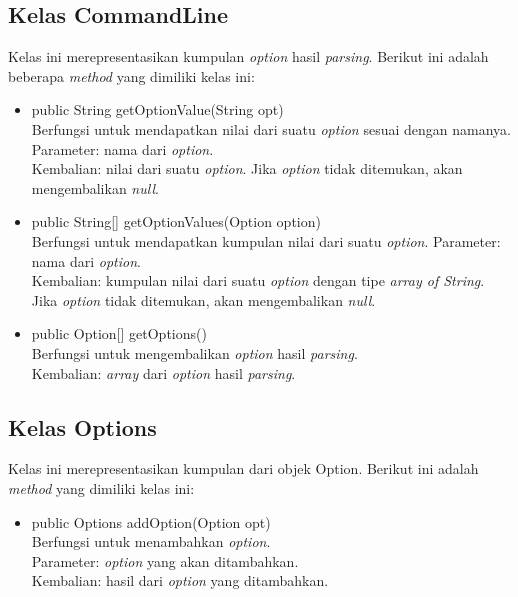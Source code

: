 \subsection{Kelas CommandLine}
\label{subsec:commandline}
Kelas ini merepresentasikan kumpulan \textit{option} hasil \textit{parsing}.
Berikut ini adalah beberapa \textit{method} yang dimiliki kelas ini: 
\begin{itemize}
\item public String getOptionValue(String opt)\\
Berfungsi untuk mendapatkan nilai dari suatu \textit{option} sesuai dengan namanya.\\
Parameter: nama dari \textit{option}.\\
Kembalian: nilai dari suatu \textit{option}. Jika \textit{option} tidak ditemukan, akan mengembalikan \textit{null}.
\item public String[] getOptionValues(Option option)\\
Berfungsi untuk mendapatkan kumpulan nilai dari suatu \textit{option}.
Parameter: nama dari \textit{option}.\\
Kembalian: kumpulan nilai dari suatu \textit{option} dengan tipe \textit{array of String}. Jika \textit{option} tidak ditemukan, akan mengembalikan \textit{null}.
\item public Option[] getOptions()\\
Berfungsi untuk mengembalikan \textit{option} hasil \textit{parsing}.\\ 
Kembalian: \textit{array} dari \textit{option} hasil \textit{parsing}.


\end{itemize}

\subsection{Kelas Options}
\label{subsec:options}
Kelas ini merepresentasikan kumpulan dari objek Option. Berikut ini adalah \textit{method} yang dimiliki kelas ini: 
\begin{itemize}
\item public Options addOption(Option opt)\\
Berfungsi untuk menambahkan \textit{option}.\\
Parameter: \textit{option} yang akan ditambahkan.\\
Kembalian: hasil dari \textit{option} yang ditambahkan.

\end{itemize}


